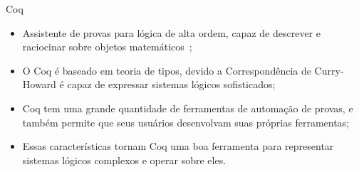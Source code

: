 \begin{frame}{Coq}
    \begin{itemize}
        \item Assistente de provas para lógica de alta ordem, capaz de descrever e raciocinar sobre objetos matemáticos~\cite{geuvers2009proof};
        \item O Coq é baseado em teoria de tipos, devido a Correspondência de Curry-Howard é capaz de expressar sistemas lógicos sofisticados;
        \item Coq tem uma grande quantidade de ferramentas de automação de provas, e também permite que seus usuários desenvolvam suas próprias ferramentas;
        \item Essas características tornam Coq uma boa ferramenta para representar sistemas lógicos complexos e operar sobre eles.
    \end{itemize}
\end{frame}